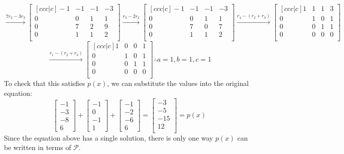 \documentclass[12pt]{article}
\begin{document}
$$
\overset{7r_2-3r_3}{\longrightarrow}
\begin{bmatrix}[ccc|c]
   -1 & -1 & -1 & -3 \\
   0 & 0 & 1 & 1 \\
   0 & 7 & 2 & 9 \\
   0 & 1 & 1 & 2 \\
\end{bmatrix} \overset{r_3-2r_2}{\longrightarrow}
\begin{bmatrix}[ccc|c]
   -1 & -1 & -1 & -3 \\
   0 & 0 & 1 & 1 \\
   0 & 7 & 0 & 7 \\
  0 & 1 & 1 & 2 \\
\end{bmatrix} \overset{r_4-(r_2+r_3)}{\longrightarrow}
\begin{bmatrix}[ccc|c]
   1 & 1 & 1 & 3 \\
   0 & 1 & 0 & 1\\
   0 & 0 & 1 & 1 \\
   0 & 0 & 0 & 0 \\
\end{bmatrix}
$$
$$
\overset{r_1-(r_2+r_3)}{\longrightarrow}
\begin{bmatrix}[ccc|c]
   1 & 0 & 0 & 1 \\
   0 & 1 & 0 & 1\\
   0 & 0 & 1 & 1 \\
   0 & 0 & 0 & 0 \\
\end{bmatrix}
\therefore a=1, b=1, c=1
$$
To check that this satisfies $p(x)$, we can substitute the values into the original equation:
$$
\begin{bmatrix}
   -1 \\
   -3 \\
   -8 \\
   6
\end{bmatrix}
+
\begin{bmatrix}
   -1 \\
   0 \\
   -1 \\
   1
\end{bmatrix}
+
\begin{bmatrix}
   -1 \\
   -2 \\
   -6 \\
   6
\end{bmatrix}
=
\begin{bmatrix}
   -3 \\
   -5 \\
   -15 \\
   12 \\
\end{bmatrix}
= p(x)
$$
Since the equation above has a single solution, there is only one way $p(x)$ can be written in terms of $\mathcal{P}$.
\end{document}

